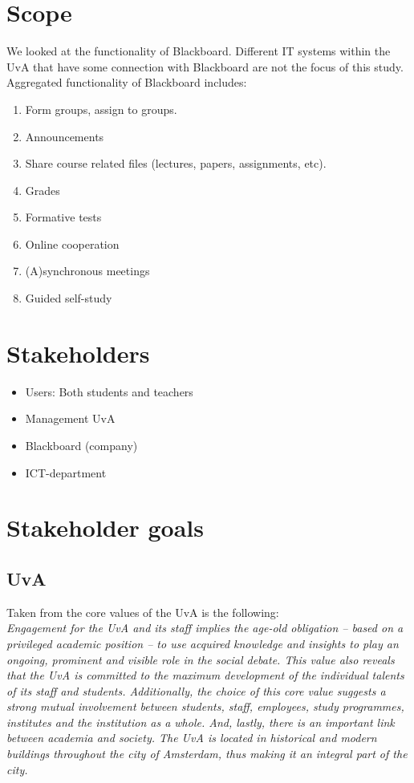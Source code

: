 \section{Scope}
We looked at the functionality of Blackboard. Different IT systems within the UvA that have some connection with Blackboard are not the focus of this study. Aggregated functionality of Blackboard includes:
\begin{enumerate}
	\item Form groups, assign to groups.
	\item Announcements
	\item Share course related files (lectures, papers, assignments, etc).
	\item Grades
	\item Formative tests
	\item Online cooperation
	\item (A)synchronous meetings
	\item Guided self-study
\end{enumerate}


\section{Stakeholders}
\begin{itemize}
	\item Users: Both students and teachers
	\item Management UvA
	\item Blackboard (company)
	\item ICT-department
\end{itemize}

\section{Stakeholder goals}\label{ch:stakeholder_goals}
\subsection{UvA}
\label{uva_goals}
Taken from the core values of the UvA is the following: \\
\textit{Engagement for the UvA and its staff implies the age-old obligation – based on a privileged academic position – to use acquired knowledge and insights to play an ongoing, prominent and visible role in the social debate. This value also reveals that the UvA is committed to the maximum development of the individual talents of its staff and students. Additionally, the choice of this core value suggests a strong mutual involvement between students, staff, employees, study programmes, institutes and the institution as a whole. And, lastly, there is an important link between academia and society. The UvA is located in historical and modern buildings throughout the city of Amsterdam, thus making it an integral part of the city.}

